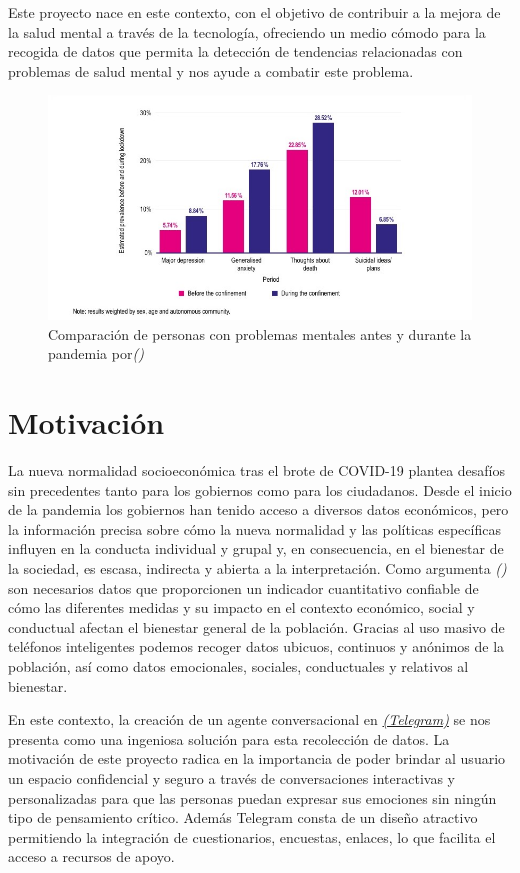 Este proyecto nace en este contexto, con el objetivo de contribuir a la mejora de la salud mental a través de la tecnología, ofreciendo un medio cómodo para la recogida de datos que permita la detección de tendencias relacionadas con problemas de salud mental y nos ayude a combatir este problema.

\begin{figure}[!ht]
    \centering
    \includegraphics[width=1\textwidth]{imagenes/graficaCovid.jpg}
    \caption{ Comparación de personas con problemas mentales antes y durante la pandemia por\textit{(\cite{impactocovid})}}
    \label{fig:impacto}
\end{figure}


\section{Motivación}

La nueva normalidad socioeconómica tras el brote de COVID-19 plantea desafíos sin precedentes tanto para los gobiernos como para los ciudadanos. Desde el inicio de la pandemia los gobiernos han tenido acceso a diversos datos económicos, pero la información precisa sobre cómo la nueva normalidad y las políticas específicas influyen en la conducta individual y grupal y, en consecuencia, en el bienestar de la sociedad, es escasa, indirecta y abierta a la interpretación. Como argumenta \textit{(\cite{medicion2009})} son necesarios datos que proporcionen un indicador cuantitativo confiable de cómo las diferentes medidas y su impacto en el contexto económico, social y conductual afectan el bienestar general de la población. Gracias al uso masivo de teléfonos inteligentes podemos recoger datos ubicuos, continuos y anónimos de la población, así como datos emocionales, sociales, conductuales y relativos al bienestar.

En este contexto, la creación de un agente conversacional en \href{https://telegram.com.es/}{\textit{(Telegram)}} se nos presenta como una ingeniosa solución para esta recolección de datos. La motivación de este proyecto radica en la importancia de poder brindar al usuario un espacio confidencial y seguro a través de conversaciones interactivas y personalizadas para que las personas puedan expresar sus emociones sin ningún tipo de pensamiento crítico.
Además Telegram consta de un diseño atractivo permitiendo la integración de cuestionarios, encuestas, enlaces, lo que facilita el acceso a recursos de apoyo.

